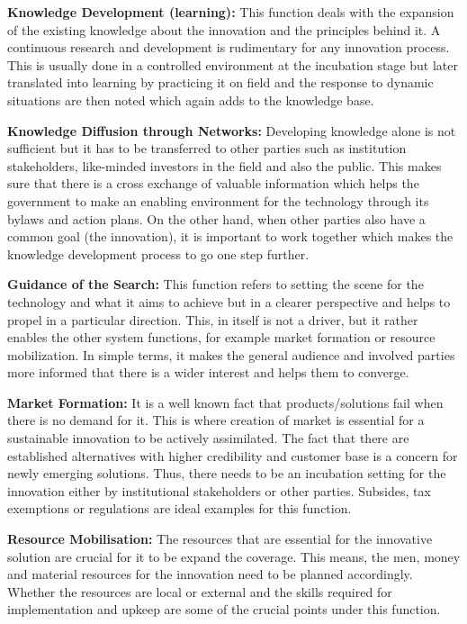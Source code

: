 \textbf{Knowledge Development (learning):} This function deals with the expansion of the existing knowledge about the innovation and the principles behind it. A continuous research and development is rudimentary for any innovation process. This is usually done in a controlled environment at the incubation stage but later translated into learning by practicing it on field and the response to dynamic situations are then noted which again adds to the knowledge base.

\textbf{Knowledge Diffusion through Networks:} Developing knowledge alone is not sufficient but it has to be transferred to other parties such as institution stakeholders, like-minded investors in the field and also the public. This makes sure that there is a cross exchange of valuable information which helps the government to make an enabling environment for the technology through its bylaws and action plans. On the other hand, when other parties also have a common goal (the innovation), it is important to work together which makes the knowledge development process to go one step further. 

\textbf{Guidance of the Search:} This function refers to setting the scene for the technology and what it aims to achieve but in a clearer perspective and helps to propel in a particular direction. This, in itself is not a driver, but it rather enables the other system functions, for example market formation or resource mobilization. In simple terms, it makes the general audience and involved parties more informed that there is a wider interest and helps them to converge.

\textbf{Market Formation:} It is a well known fact that products/solutions fail when there is no demand for it. This is where creation of market is essential for a sustainable innovation to be actively assimilated. The fact that there are established alternatives with higher credibility and customer base is a concern for newly emerging solutions. Thus, there needs to be an incubation setting for the innovation either by institutional stakeholders or other parties. Subsides, tax exemptions or regulations are ideal examples for this function.

\textbf{Resource Mobilisation:} The resources that are essential for the innovative solution are crucial for it to be expand the coverage. This means, the men, money and material resources for the innovation need to be planned accordingly. Whether the resources are local or external and the skills required for implementation and upkeep are some of the crucial points under this function.


